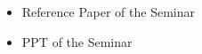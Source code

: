 \begin{itemize}
\item Reference Paper of the Seminar
\item PPT of the Seminar
\end{itemize}





%

%
%
%
%


